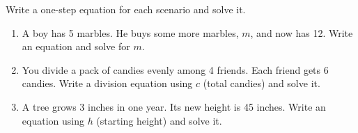 \documentclass[12pt, letterpaper, fleqn]{article}
\begin{document}
\noindent
Write a one-step equation for each scenario and solve it.

\vspace{3mm}

\begin{enumerate}[itemsep=2.2cm, leftmargin=0.6cm]

\item A boy has 5 marbles. He buys some more marbles, $m$, and now has 12. Write an equation and solve for $m$.

\vspace{2.2cm}

\item You divide a pack of candies evenly among 4 friends. Each friend gets 6 candies. Write a division equation using $c$ (total candies) and solve it.

\vspace{2.2cm}

\item A tree grows 3 inches in one year. Its new height is 45 inches. Write an equation using $h$ (starting height) and solve it.

\vspace{2.2cm}

\end{enumerate}
\end{document}
